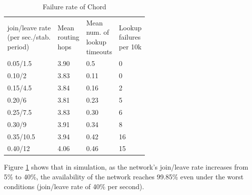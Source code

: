 \documentclass[twocolumn]{article}
\begin{document}
\begin{table}[htpb]

    \label{failure}
  \begin{tabular}{l|l|l|l}
\cline{1-4}
  \shortstack{join/leave rate \\ (per sec./stab. \\ period)}
  & \shortstack{Mean \\routing\\ hops}
  &\shortstack{Mean \\num. of \\lookup \\timeouts}
  &\shortstack{Lookup \\ failures \\ per 10k} \\ \cline{1-4}
0.05/1.5                        & 3.90             & 0.5              &    0   \\ \cline{1-4}
0.10/2                      & 3.83             & 0.11             &    0   \\ \cline{1-4}
  0.15/4.5                      & 3.84             & 0.16             &    2   \\ \cline{1-4}

  0.20/6                      & 3.81             & 0.23             &    5   \\ \cline{1-4}
0.25/7.5                      & 3.83             & 0.30             &    6   \\ \cline{1-4}
  0.30/9                      & 3.91             & 0.34             &    8   \\ \cline{1-4}
  0.35/10.5                      & 3.94             & 0.42             &    16   \\ \cline{1-4}
0.40/12                      & 4.06             & 0.46             &    15   \\ \cline{1-4}

\end{tabular}
\caption{Failure rate of Chord \cite{Chord}}
\end{table}

Figure \ref{failure} shows that in simulation, as the network's join/leave rate increases from 5\% to 40\%, the availability of the network reaches 99.85\% even under the worst conditions (join/leave rate of 40\% per second).
\end{document}
